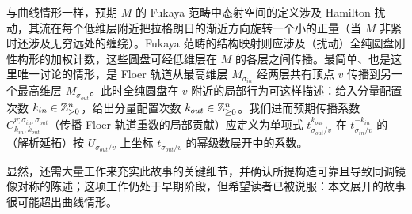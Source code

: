 与曲线情形一样，预期 $M$ 的 Fukaya 范畴中态射空间的定义涉及 Hamilton 扰动，其流在每个低维层附近把拉格朗日的渐近方向旋转一个小的正量（当 $M$ 非紧时还涉及无穷远处的缠绕）。Fukaya 范畴的结构映射则应涉及（扰动）全纯圆盘刚性构形的加权计数，这些圆盘可经低维层在 $M$ 的各层之间传播。最简单、也是这里唯一讨论的情形，是 Floer 轨道从最高维层 $M_{\sigma_{in}}$ 经两层共有顶点 $v$ 传播到另一个最高维层 $M_{\sigma_{out}}$。此时全纯圆盘在 $v$ 附近的局部行为可这样描述：给入分量配置次数 $k_{in}\in \mathbb{Z}_{>0}^n$，给出分量配置次数 $k_{out}\in \mathbb{Z}_{\geq 0}^n$。我们进而预期传播系数 $C^{v;\sigma_{in},\sigma_{out}}_{k_{in},k_{out}}$（传播 Floer 轨道重数的局部贡献）应定义为单项式 $t^{k_{out}}_{\sigma_{out}/v}$ 在 $t_{\sigma_{in}/v}^{-k_{in}}$ 的（解析延拓）按 $U_{\sigma_{out}/v}$ 上坐标 $t_{\sigma_{out}/v}$ 的幂级数展开中的系数。


显然，还需大量工作来充实此故事的关键细节，并确认所提构造可靠且导致同调镜像对称的陈述；这项工作仍处于早期阶段，但希望读者已被说服：本文展开的故事很可能超出曲线情形。